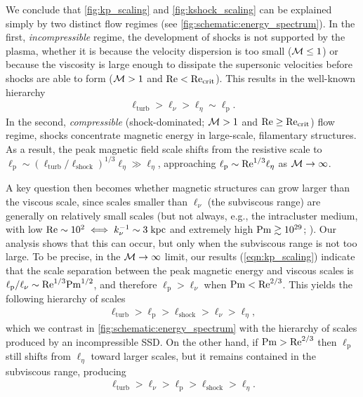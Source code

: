 We conclude that \autoref{fig:kp_scaling} and \autoref{fig:kshock_scaling} can be explained simply by two distinct flow regimes (see \autoref{fig:schematic:energy_spectrum}). In the first, \textit{incompressible} regime, the development of shocks is not supported by the plasma, whether it is because the velocity dispersion is too small ($\mathcal{M} \leq 1$) or because the viscosity is large enough to dissipate the supersonic velocities before shocks are able to form (\ie $\mathcal{M} > 1$ and $\mathrm{Re} < \mathrm{Re}_\mathrm{crit}$). This results in the well-known hierarchy
\begin{align}
   \ell_\mathrm{turb} > \ell_\nu > \ell_\eta \sim \ell_\mathrm{p}
   . \label{eqn:kp:subsonic}
\end{align}
In the second, \textit{compressible} (shock-dominated; $\mathcal{M} > 1$ and $\mathrm{Re} \geq \mathrm{Re}_\mathrm{crit}$) flow regime, shocks concentrate magnetic energy in large-scale, filamentary structures. As a result, the peak magnetic field scale shifts from the resistive scale to $\ell_\mathrm{p} \sim (\ell_\mathrm{turb}/\ell_\mathrm{shock})^{1/3} \ell_\eta \gg \ell_\eta$, approaching $\ell_\mathrm{p} \sim \mathrm{Re}^{1/3} \ell_\eta$ as \mbox{$\mathcal{M} \to \infty$}.

A key question then becomes whether magnetic structures can grow larger than the viscous scale, since scales smaller than $\ell_\nu$ (the subviscous range) are generally on relatively small scales (but not always, e.g., the intracluster medium, with low $\mathrm{Re} \sim 10^2 \iff k_\nu^{-1} \sim 3\;\mathrm{kpc}$ and extremely high $\mathrm{Pm} \gtrsim 10^{29}$; \citealt{Schekochihin2006_ICM,StOnge2020_weakly_collisional_dynamo}). Our analysis shows that this can occur, but only when the subviscous range is not too large. To be precise, in the $\mathcal{M} \to \infty$ limit, our results (\autoref{eqn:kp_scaling}) indicate that the scale separation between the peak magnetic energy and viscous scales is $\ell_\mathrm{p}/\ell_\nu \sim \mathrm{Re}^{1/3} \mathrm{Pm}^{1/2}$, and therefore $\ell_\mathrm{p} > \ell_\nu$ when $\mathrm{Pm} < \mathrm{Re}^{2/3}$. This yields the following hierarchy of scales
\begin{align}
    \ell_\mathrm{turb} > \ell_\mathrm{p} > \ell_\mathrm{shock} > \ell_\nu > \ell_\eta
    , \label{eqn:kp:supersonic}
\end{align}
which we contrast in \autoref{fig:schematic:energy_spectrum} with the hierarchy of scales produced by an incompressible SSD. On the other hand, if $\mathrm{Pm} > \mathrm{Re}^{2/3}$ then $\ell_\mathrm{p}$ still shifts from $\ell_\eta$ toward larger scales, but it remains contained in the subviscous range, producing
\begin{align}
    \ell_\mathrm{turb} > \ell_\nu > \ell_\mathrm{p} > \ell_\mathrm{shock} > \ell_\eta
    .
\end{align}

